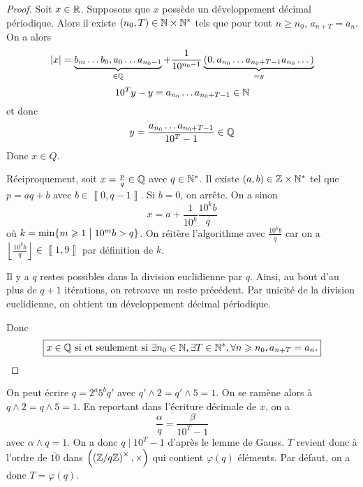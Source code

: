 \documentclass[12pt]{article}
\begin{document}
\begin{proof}
	Soit $x\in\mathbb{R}$. Supposons que $x$ possède un développement décimal périodique. Alors il existe $(n_{0},T)\in\mathbb{N}\times\mathbb{N}^{*}$ tels que pour tout $n\geqslant n_{0}$, $a_{n+T}=a_{n}$. On a alors 
	\begin{equation}
		\vert x\vert=\underbrace{b_{m}\dots b_{0},a_{0}\dots a_{n_{0}-1}}_{\in\mathbb{Q}}+\frac{1}{10^{n_{0}-1}}\underbrace{(0,a_{n_{0}}\dots a_{n_{0}+T-1}a_{n_{0}}\dots)}_{=y}
	\end{equation}
	\begin{equation}
		10^{T}y-y=a_{n_{0}}\dots a_{n_{0}+T-1}\in\mathbb{N}
	\end{equation}
	et donc 
	\begin{equation}
		y=\frac{a_{n_{0}}\dots a_{n_{0}+T-1}}{10^{T}-1}\in\mathbb{Q}
	\end{equation}
	Donc $x\in Q$.

	Réciproquement, soit $x=\frac{p}{q}\in\mathbb{Q}$ avec $q\in\mathbb{N}^{*}$. Il existe $(a,b)\in\mathbb{Z}\times\mathbb{N}^{*}$ tel que $p=aq+b$ avec $b\in\left\llbracket 0,q-1\right\rrbracket$. Si $b=0$, on arrête. On a sinon 
	\begin{equation}
		x=a+\frac{1}{10^{k}}\frac{10^{k}b}{q}
	\end{equation}
	où $k=\min\{m\geqslant1\bigm| 10^{m}b>q\}$.
	On réitère l'algorithme avec $\frac{10^{k}b}{q}$ car on a $\left\lfloor\frac{10^{k}b}{q}\right\rfloor\in\left\llbracket 1,9\right\rrbracket$ par définition de $k$.

	Il y a $q$ restes possibles dans la division euclidienne par $q$. Ainsi, au bout d'au plus de $q+1$ itérations, on retrouve un reste précédent. Par unicité de la division euclidienne, on obtient un développement décimal périodique.

	Donc 
	\begin{equation}
		\boxed{x\in\mathbb{Q}\text{ si et seulement si }\exists n_{0}\in\mathbb{N},\exists T\in\mathbb{N}^{*},\forall n\geqslant n_{0},a_{n+T}=a_{n}.}
	\end{equation}
\end{proof}

\begin{remark}
	On peut écrire $q=2^{a}5^{b}q'$ avec $q'\wedge 2=q'\wedge 5=1$. On se ramène alors à $q\wedge2=q\wedge5=1$. En reportant dans l'écriture décimale de $x$, on a 
	\begin{equation}
		\frac{\alpha}{q}=\frac{\beta}{10^{T}-1}
	\end{equation}
	avec $\alpha\wedge q=1$. On a donc $q\mid 10^{T}-1$ d'après le lemme de Gauss. $T$ revient donc à l'ordre de $\overline{10}$ dans $\left(\left(\mathbb{Z}/q\mathbb{Z}\right)^{\times},\times\right)$ qui contient $\varphi(q)$ éléments. Par défaut, on a donc $T=\varphi(q)$.
\end{remark}
\end{document}
